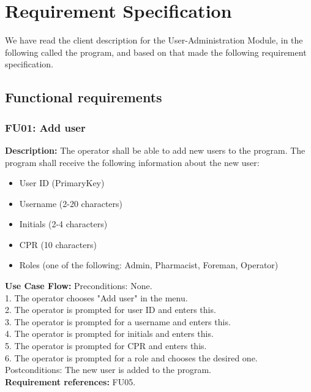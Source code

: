 \section{Requirement Specification}
We have read the client description for the User-Administration Module, in the following called the program, and based on that made the following requirement specification.

\subsection{Functional requirements}
\begin{adjustwidth}{2em}{0pt}
    
    \subsubsection*{FU01: Add user}
    \begin{adjustwidth}{1em}{0pt}
        \textbf{Description:}
        The operator shall be able to add new users to the program. The program shall receive the following information about the new user:
        \begin{multicols}{2}
            \begin{itemize}
                \item User ID (PrimaryKey)
                \item Username (2-20 characters)
                \item Initials (2-4 characters)
                \item CPR (10 characters)
                \item Roles (one of the following: Admin, Pharmacist, Foreman, Operator)
            \end{itemize}
        \end{multicols}
        \noindent\textbf{Use Case Flow:}
        Preconditions: None.\\
        1. The operator chooses "Add user" in the menu.\\
        2. The operator is prompted for user ID and enters this.\\
        3. The operator is prompted for a username and enters this.\\
        4. The operator is prompted for initials and enters this.\\
        5. The operator is prompted for CPR and enters this.\\
        6. The operator is prompted for a role and chooses the desired one.\\
        Postconditions: The new user is added to the program.\\
        \textbf{Requirement references:}
        FU05.
    \end{adjustwidth}
    

\end{adjustwidth}
